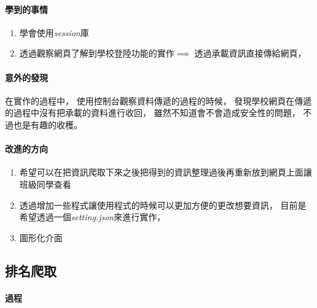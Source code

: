 \documentclass[12pt,oneside]{ctexart}
\begin{document}
\paragraph{ 學到的事情 }
\begin{adjustwidth}{2em}{0em}
\begin{enumerate}
    \item 
        學會使用\textit{session}庫
    \item 
        透過觀察網頁了解到學校登陸功能的實作$\implies$
        透過承載資訊直接傳給網頁，
\end{enumerate}  
\end{adjustwidth}

\paragraph{ 意外的發現 }
\begin{adjustwidth}{2em}{0em}
    在實作的過程中，
    使用控制台觀察資料傳遞的過程的時候，
    發現學校網頁在傳遞的過程中沒有把承載的資料進行收回，
    雖然不知道會不會造成安全性的問題，
    不過也是有趣的收穫。
\end{adjustwidth}
\paragraph{改進的方向}
\begin{adjustwidth}{2em}{0em}
\begin{enumerate}
    \item
        希望可以在把資訊爬取下來之後把得到的資訊整理過後再重新放到網頁上面讓班級同學查看
    \item 
        透過增加一些程式讓使用程式的時候可以更加方便的更改想要資訊，
        目前是希望透過一個\textit{setting.json}來進行實作，
    \item 
        圖形化介面
\end{enumerate}
    
\end{adjustwidth}


\clearpage
\subsection{ 排名爬取 }



\paragraph{ 過程 }
\hspace*{\fill}\\
\end{document}
